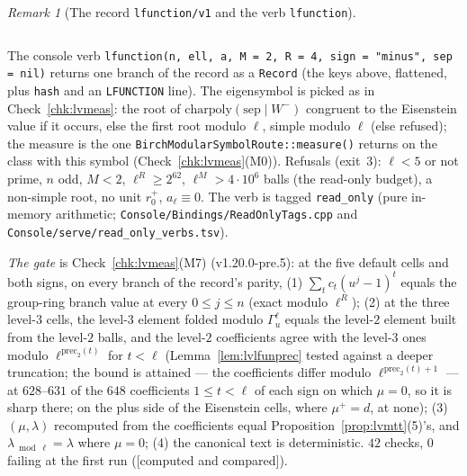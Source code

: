 \documentclass[11pt]{article}
\theoremstyle{remark}
\newtheorem{remark}[theorem]{Remark}
\newcommand{\Ga}{\Gamma}
\newcommand{\CMPD}{\textsf{[computed and compared]}}   %
\begin{document}
\begin{remark}[The record \texttt{lfunction/v1} and the verb \texttt{lfunction}]
\begin{center}
\begin{tabular}{@{}lp{}@{}}
\bottomrule
\end{tabular}
\end{center}
The console verb \texttt{lfunction(n, ell, a, M = 2, R = 4, sign = "minus", sep = nil)} returns one branch of the record as a \texttt{Record} (the keys above, flattened, plus \texttt{hash} and an
\texttt{LFUNCTION} line). The eigensymbol is picked as in Check~\ref{chk:lvmeas}: the root of $\mathrm{charpoly}(\mathrm{sep}\mid W^{-})$ congruent to the Eisenstein value if it occurs, else the
first root modulo $\ell$, simple modulo $\ell$ (else refused); the measure is the one \texttt{BirchModularSymbolRoute::measure()} returns on the class with this symbol (Check~\ref{chk:lvmeas}(M0)).
Refusals (exit~$3$): $\ell<5$ or not prime, $n$ odd, $M<2$, $\ell^{R}\ge2^{62}$, $\ell^{M}>4\cdot10^{6}$ balls (the read-only budget), a non-simple root, no unit $r^{+}_0$, $a_\ell\equiv0$. The verb is
tagged \texttt{read\_only} (pure in-memory arithmetic; \texttt{Console/Bindings/ReadOnlyTags.cpp} and \texttt{Console/serve/read\_only\_verbs.tsv}).
\end{remark}

\noindent\emph{The gate} is Check~\ref{chk:lvmeas}(M7) (v1.20.0-pre.5): at the five default cells and both signs, on every branch of the record's parity, (1) $\sum_tc_t(u^{j}-1)^{t}$ equals the
group-ring branch value at every $0\le j\le n$ (exact modulo $\ell^{R}$); (2) at the three level-$3$ cells, the level-$3$ element folded modulo $\Ga_u^{\ell}$ equals the level-$2$ element
built from the level-$2$ balls, and the level-$2$ coefficients agree with the level-$3$ ones modulo $\ell^{\mathrm{prec}_2(t)}$ for $t<\ell$ (Lemma~\ref{lem:lvlfunprec} tested against a deeper
truncation; the bound is attained --- the coefficients differ modulo $\ell^{\mathrm{prec}_2(t)+1}$ --- at $628$--$631$ of the $648$ coefficients $1\le t<\ell$ of each sign on which $\mu=0$, so it is sharp there; on the plus side of the Eisenstein cells, where $\mu^{+}=d$, at none); (3) $(\mu,\lambda)$ recomputed from the coefficients equal Proposition~\ref{prop:lvmtt}(5)'s,
and $\lambda_{\bmod\ell}=\lambda$ where $\mu=0$; (4) the canonical text is deterministic. $42$ checks, $0$ failing at the first run (\CMPD).
\end{document}
